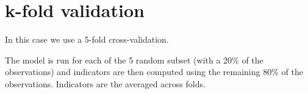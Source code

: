 \documentclass[
]{book}
\newenvironment{Shaded}{\begin{snugshade}}{\end{snugshade}}
\newcommand{\AttributeTok}[1]{\textcolor[rgb]{0.13,0.29,0.53}{#1}}
\newcommand{\CommentTok}[1]{\textcolor[rgb]{0.56,0.35,0.01}{\textit{#1}}}
\newcommand{\DecValTok}[1]{\textcolor[rgb]{0.00,0.00,0.81}{#1}}
\newcommand{\FunctionTok}[1]{\textcolor[rgb]{0.13,0.29,0.53}{\textbf{#1}}}
\newcommand{\NormalTok}[1]{#1}
\newcommand{\OtherTok}[1]{\textcolor[rgb]{0.56,0.35,0.01}{#1}}
\newcommand{\SpecialCharTok}[1]{\textcolor[rgb]{0.81,0.36,0.00}{\textbf{#1}}}
\begin{document}
\section{k-fold validation}\label{k-fold-validation}

In this case we use a 5-fold cross-validation.

\begin{Shaded}
\end{Shaded}

The model is run for each of the 5 random subset (with a 20\% of the observations) and indicators are then computed using the remaining 80\% of the observations. Indicators are the averaged across folds.
\end{document}
